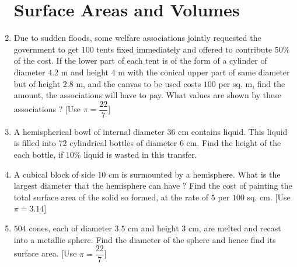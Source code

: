 \documentclass[10pt,-letter paper]{article}
\begin{document}
\begin{enumerate}
\section{Surface Areas and Volumes}
\item Due to sudden floods, some welfare associations jointly requested the government to get $100$ tents fixed immediately and offered to contribute $ 50\% $ of the cost. If the lower part of each tent is of the form of a cylinder of diameter $4.2$ m and height $4$ m with the conical upper part of same diameter but of height $2.8$ m, and the canvas to be used costs \rupee $100$ per sq. m, find the amount, the associations will have to pay. What values are shown by these associations ? [Use $\pi=\dfrac{22}{7}$]
\item A hemispherical bowl of internal diameter $36$ cm contains liquid. This liquid is filled into $72$ cylindrical bottles of diameter $6$ cm. Find the height of the each bottle, if $10 \% $ liquid is wasted in this transfer.
\item A cubical block of side $10$ cm is surmounted by a hemisphere. What is the largest diameter that the hemisphere can have ? Find the cost of painting the total surface area of the solid so formed, at the rate of \rupee $5$ per $100$ sq. cm. [Use $\pi= 3.14$]
\item $504$ cones, each of diameter $3.5$ cm and height $3$ cm, are melted and recast into a metallic sphere. Find the diameter of the sphere and hence find its surface area. [Use $\pi=\dfrac{22}{7}$]



\end{enumerate}
\end{document}
